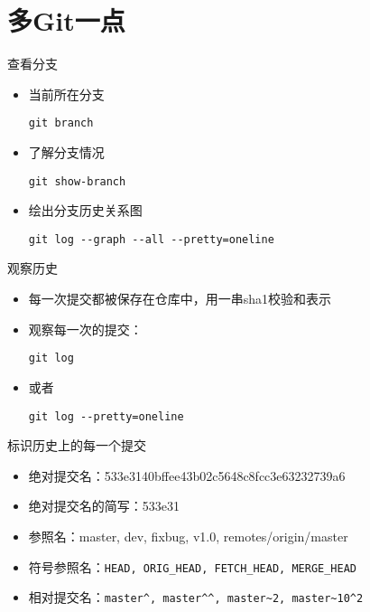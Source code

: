\part{多Git一点}

\begin{frame}[<+->][fragile]{查看分支}
    \begin{itemize}
        \item 当前所在分支
        \begin{Verbatim}[frame=single,commandchars=\\\{\}]
git branch        
        \end{Verbatim}
        \item 了解分支情况
        \begin{Verbatim}[frame=single,commandchars=\\\{\}]
git show-branch
        \end{Verbatim}
        \item 绘出分支历史关系图
        \begin{Verbatim}[frame=single,commandchars=\\\{\}]
git log --graph --all --pretty=oneline
        \end{Verbatim}
    \end{itemize}
\end{frame}

\begin{frame}[<+->][fragile]{观察历史}
    \begin{itemize}
        \item 每一次提交都被保存在仓库中，用一串sha1校验和表示
        \item 观察每一次的提交：
\begin{Verbatim}[frame=single,commandchars=\\\{\}]
git log
\end{Verbatim}
        \item 或者
\begin{Verbatim}[frame=single,commandchars=\\\{\}]
git log --pretty=oneline
\end{Verbatim}
    \end{itemize}
\end{frame}

\begin{frame}[<+->][fragile]{标识历史上的每一个提交}
    \begin{itemize}
        \item 绝对提交名：533e3140bffee43b02c5648c8fcc3e63232739a6
        \item 绝对提交名的简写：533e31
        \item 参照名：master, dev, fixbug, v1.0, remotes/origin/master
        \item 符号参照名：\verb|HEAD, ORIG_HEAD, FETCH_HEAD, MERGE_HEAD|
        \item 相对提交名：\verb|master^, master^^, master~2, master~10^2|
    \end{itemize}
\end{frame}

